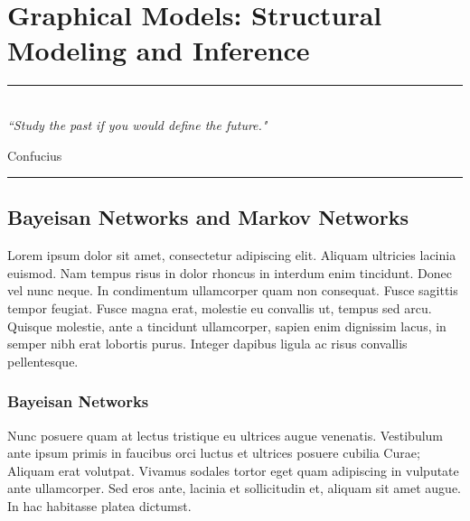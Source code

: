 
\chapter{Graphical Models: Structural Modeling and Inference} %

\label{Chapter2} %


\rule{\textwidth}{0.4pt} \\[0.5cm]
\textit{``Study the past if you would define the future."}

\begin{flushright}
Confucius
\end{flushright}
\rule{\textwidth}{0.4pt} 





\section{Bayeisan Networks and Markov Networks}

Lorem ipsum dolor sit amet, consectetur adipiscing elit. Aliquam ultricies lacinia euismod. Nam tempus risus in dolor rhoncus in interdum enim tincidunt. Donec vel nunc neque. In condimentum ullamcorper quam non consequat. Fusce sagittis tempor feugiat. Fusce magna erat, molestie eu convallis ut, tempus sed arcu. Quisque molestie, ante a tincidunt ullamcorper, sapien enim dignissim lacus, in semper nibh erat lobortis purus. Integer dapibus ligula ac risus convallis pellentesque.

\subsection{Bayeisan Networks}

Nunc posuere quam at lectus tristique eu ultrices augue venenatis. Vestibulum ante ipsum primis in faucibus orci luctus et ultrices posuere cubilia Curae; Aliquam erat volutpat. Vivamus sodales tortor eget quam adipiscing in vulputate ante ullamcorper. Sed eros ante, lacinia et sollicitudin et, aliquam sit amet augue. In hac habitasse platea dictumst.

